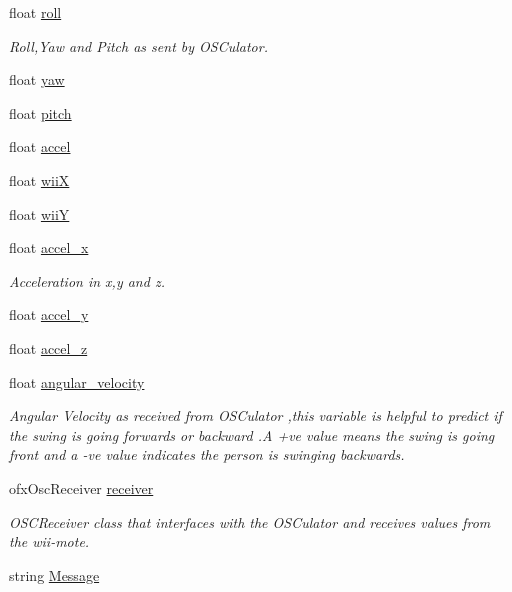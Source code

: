 \begin{DoxyCompactItemize}
float \hyperlink{group___wii_mote_ga020730abb55e6ae6d0a28edee19050e0}{roll}
\begin{DoxyCompactList}\small\item\em Roll,Yaw and Pitch as sent by O\-S\-Culator. \end{DoxyCompactList}\item 
float \hyperlink{group___wii_mote_ga865985f78dd5def3ed20c87b9fc772b6}{yaw}
\item 
float \hyperlink{group___wii_mote_gaabbebeb113838374f659e86a0355b260}{pitch}
\item 
float \hyperlink{group___wii_mote_ga8e560e923c82d421857538e4a5927542}{accel}
\item 
float \hyperlink{group___wii_mote_ga7a77e8633c3a94e3e409a33a5cd9ae3f}{wii\-X}
\item 
float \hyperlink{group___wii_mote_ga5ae41896388ae16ee530beca5333e02a}{wii\-Y}
\item 
float \hyperlink{group___wii_mote_gad1738ff98d225f80b853a9ddc9f5a116}{accel\-\_\-x}
\begin{DoxyCompactList}\small\item\em Acceleration in x,y and z. \end{DoxyCompactList}\item 
float \hyperlink{group___wii_mote_ga204bcb2412a70a65ebea6008ee8c4eb0}{accel\-\_\-y}
\item 
float \hyperlink{group___wii_mote_ga61dbdd5c0b868568dde40a52f6e56054}{accel\-\_\-z}
\item 
float \hyperlink{group___wii_mote_ga98e05c3206ff95fccfebfc9df5317598}{angular\-\_\-velocity}
\begin{DoxyCompactList}\small\item\em Angular Velocity as received from O\-S\-Culator ,this variable is helpful to predict if the swing is going forwards or backward .A +ve value means the swing is going front and a -\/ve value indicates the person is swinging backwards. \end{DoxyCompactList}\item 
ofx\-Osc\-Receiver \hyperlink{group___wii_mote_ga034c44ff60fa1e5f021e90d5410ba657}{receiver}
\begin{DoxyCompactList}\small\item\em O\-S\-C\-Receiver class that interfaces with the O\-S\-Culator and receives values from the wii-\/mote. \end{DoxyCompactList}\item 
string \hyperlink{group___wii_mote_ga0124035d0454fb6bd9152f8a87c40677}{Message}

\end{DoxyCompactItemize}
